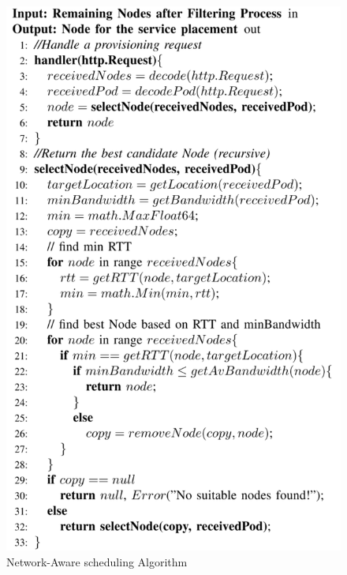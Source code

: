 \begin{figure}
  \centering
  \includegraphics[width=\linewidth]{figures/mlcn-k8s-ns-algo.pdf}
  \caption{Network-Aware scheduling Algorithm\cite{Santos2019}}
  \label{fig:k8s-ns-algo}
\end{figure}
